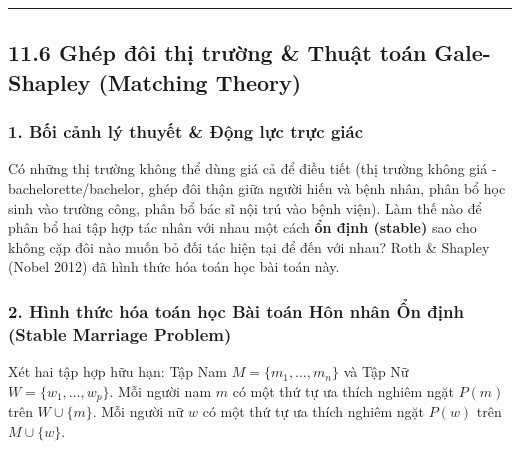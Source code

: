 \documentclass[
]{article}
\begin{document}
\begin{center}\rule{0.5\linewidth}{0.5pt}\end{center}

\subsection{11.6 Ghép đôi thị trường \& Thuật toán Gale-Shapley
(Matching
Theory)}\label{ghuxe9p-ux111uxf4i-thux1ecb-trux1b0ux1eddng-thuux1eadt-touxe1n-gale-shapley-matching-theory}

\subsubsection{1. Bối cảnh lý thuyết \& Động lực trực
giác}\label{bux1ed1i-cux1ea3nh-luxfd-thuyux1ebft-ux111ux1ed9ng-lux1ef1c-trux1ef1c-giuxe1c-5}

Có những thị trường không thể dùng giá cả để điều tiết (thị trường không
giá - bachelorette/bachelor, ghép đôi thận giữa người hiến và bệnh nhân,
phân bổ học sinh vào trường công, phân bổ bác sĩ nội trú vào bệnh viện).
Làm thế nào để phân bổ hai tập hợp tác nhân với nhau một cách \textbf{ổn
định (stable)} sao cho không cặp đôi nào muốn bỏ đối tác hiện tại để đến
với nhau? Roth \& Shapley (Nobel 2012) đã hình thức hóa toán học bài
toán này.

\subsubsection{2. Hình thức hóa toán học Bài toán Hôn nhân Ổn định
(Stable Marriage
Problem)}\label{huxecnh-thux1ee9c-huxf3a-touxe1n-hux1ecdc-buxe0i-touxe1n-huxf4n-nhuxe2n-ux1ed5n-ux111ux1ecbnh-stable-marriage-problem}

Xét hai tập hợp hữu hạn: Tập Nam \(M = \{m_1, \dots, m_n\}\) và Tập Nữ
\(W = \{w_1, \dots, w_p\}\). Mỗi người nam \(m\) có một thứ tự ưa thích
nghiêm ngặt \(P(m)\) trên \(W \cup \{m\}\). Mỗi người nữ \(w\) có một
thứ tự ưa thích nghiêm ngặt \(P(w)\) trên \(M \cup \{w\}\).
\end{document}
